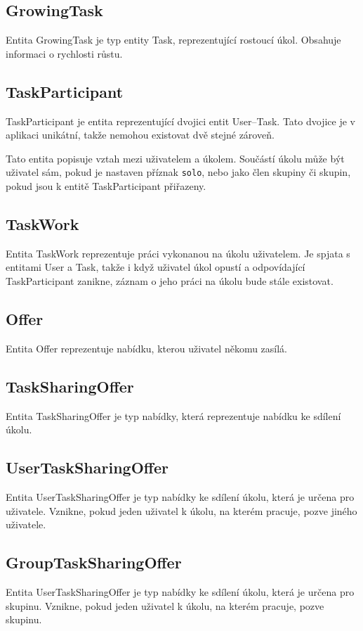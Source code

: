 \documentclass[thesis=B,czech]{FITthesis}[2012/06/26]
\begin{document}
		\subsection{GrowingTask}
			Entita GrowingTask je typ entity Task, reprezentující rostoucí úkol. Obsahuje informaci o rychlosti růstu.
		
		\subsection{TaskParticipant}
			TaskParticipant je entita reprezentující dvojici entit User--Task. Tato dvojice je v aplikaci unikátní, takže nemohou existovat dvě stejné zároveň. 
			
			Tato entita popisuje vztah mezi uživatelem a úkolem. Součástí úkolu může být uživatel sám, pokud je nastaven příznak \texttt{solo}, nebo jako člen skupiny či skupin, pokud jsou k entitě TaskParticipant přiřazeny.
		
		\subsection{TaskWork}
			Entita TaskWork reprezentuje práci vykonanou na úkolu uživatelem. Je spjata s entitami User a Task, takže i když uživatel úkol opustí a odpovídající TaskParticipant zanikne, záznam o jeho práci na úkolu bude stále existovat.
		
		\subsection{Offer}
			Entita Offer reprezentuje nabídku, kterou uživatel někomu zasílá.
		
		\subsection{TaskSharingOffer}
			Entita TaskSharingOffer je typ nabídky, která reprezentuje nabídku ke sdílení úkolu.
		
		\subsection{UserTaskSharingOffer}
			Entita UserTaskSharingOffer je typ nabídky ke sdílení úkolu, která je určena pro uživatele. Vznikne, pokud jeden uživatel k úkolu, na kterém pracuje, pozve jiného uživatele.
		
		\subsection{GroupTaskSharingOffer}
			Entita UserTaskSharingOffer je typ nabídky ke sdílení úkolu, která je určena pro skupinu. Vznikne, pokud jeden uživatel k úkolu, na kterém pracuje, pozve skupinu.
		
\end{document}
